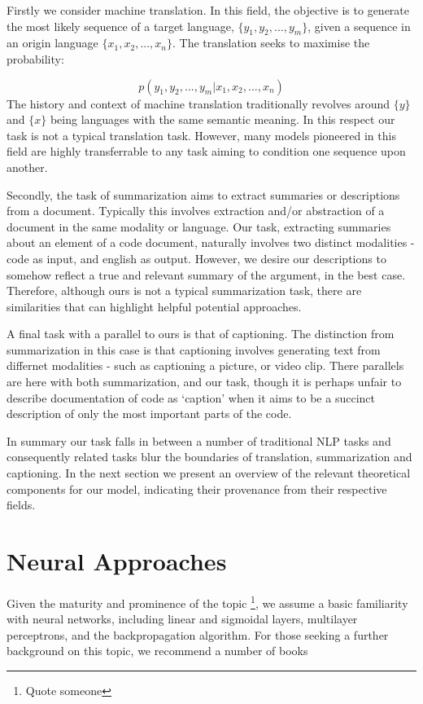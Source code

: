 Firstly we consider machine translation. In this field, the objective is to generate the most likely sequence of a target language, $\{y_1, y_2,..., y_m\}$, given a sequence in an origin language  $\{x_1, x_2,..., x_n\}$. 
The translation seeks to maximise the probability:

$$ p(y_1, y_2,..., y_m| x_1, x_2,...,x_n )$$
The history and context of machine translation traditionally revolves around $\{y\}$ and $\{x\}$ being languages with the same semantic meaning. 
In this respect our task is not a typical translation task.
However, many models pioneered in this field are highly transferrable to any task aiming to condition one sequence upon another.

Secondly, the task of summarization aims to extract summaries or descriptions from a document.
Typically this involves extraction and/or abstraction of a document in the same modality or language.
Our task, extracting summaries about an element of a code document, naturally involves two distinct modalities - code as input, and english as output.
However, we desire our descriptions to somehow reflect a true and relevant summary of the argument, in the best case.
Therefore, although ours is not a typical summarization task, there are similarities that can highlight helpful potential approaches.

A final task with a parallel to ours is that of captioning. 
The distinction from summarization in this case is that captioning involves generating text from differnet modalities - such as captioning a picture, or video clip.
There parallels are here with both summarization, and our task, though it is perhaps unfair to describe documentation of code as `caption' when it aims to be a succinct description of only the most important parts of the code.

In summary our task falls in between a number of traditional NLP tasks and consequently related tasks blur the boundaries of translation, summarization and captioning. In the next section we present an overview of the relevant theoretical components for our model, indicating their provenance from their respective fields.

\section{Neural Approaches}

Given the maturity and prominence of the topic \footnote{Quote someone}, we assume a basic familiarity with neural networks, including linear and sigmoidal layers, multilayer perceptrons, and the backpropagation algorithm. For those seeking a further background on this topic, we recommend a number of books \cite{nielsenneural} \cite{Goodfellow:2016:DL:3086952} 

